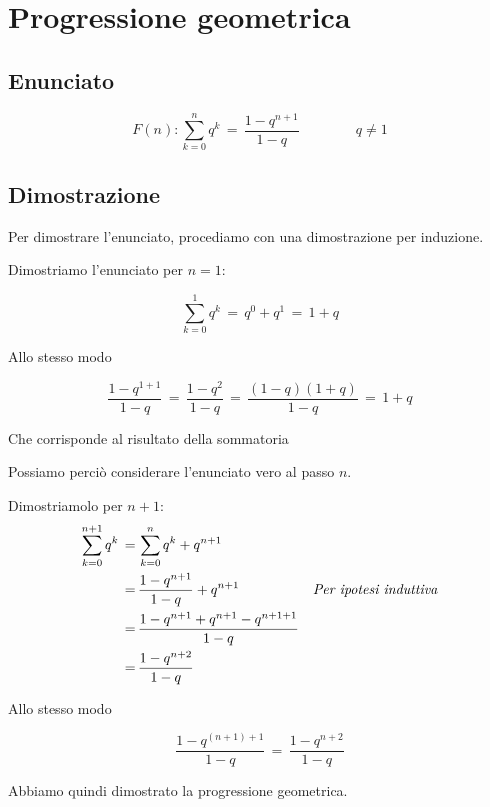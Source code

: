 \documentclass[../../dimostrazioni]{subfiles}
\begin{document}
    \chapter{Progressione geometrica}

        \section*{Enunciato}       

            \[F(n): \sum_{k=0}^{n}q^k \, = \, \frac{1-q^{n+1}}{1-q} \qquad \qquad q \neq 1 \]

        \section*{Dimostrazione}

            Per dimostrare l'enunciato, procediamo con una dimostrazione per induzione.

            \medskip

            Dimostriamo l'enunciato per \(n = 1\):
            
            \[\sum_{k=0}^{1}q^k \, = \, q^0 + q^1 \, = \, 1 + q\]
            
            Allo stesso modo

            \[\frac{1-q^{1+1}}{1-q} \, = \, \frac{1-q^2}{1-q} \, = \, \frac{(1-q)(1+q)}{1-q} \, = \, 1+q\]

            Che corrisponde al risultato della sommatoria

            Possiamo perciò considerare l'enunciato vero al passo \(n\).

            \medskip

            Dimostriamolo per \(n + 1\):
            \begin{align*}
                \sum_{k=0}^{n+1}q^k \,=& \, \sum_{k=0}^{n}q^k + q^{n+1} \\
                                =& \, \frac{1-q^{n+1}}{1-q} + q^{n+1} & \text{\emph{Per ipotesi induttiva}} \\
                                =& \, \frac{1-q^{n+1} + q^{n+1} - q^{n+1+1}}{1-q} \\
                                =& \, \frac{1-q^{n+2}}{1-q} \\
            \end{align*}

            Allo stesso modo

            \[\frac{1-q^{(n+1)+1}}{1-q} \, = \, \frac{1-q^{n+2}}{1-q} \]

            Abbiamo quindi dimostrato la progressione geometrica.
    
\end{document}
